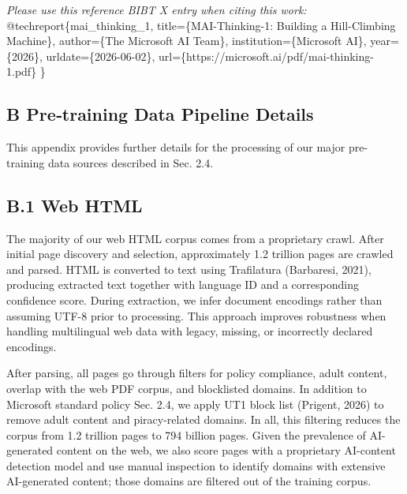 \documentclass[
  10
]{article}
\newenvironment{Shaded}{}{}
\newcommand{\CommentTok}[1]{\textcolor[rgb]{0.38,0.63,0.69}{\textit{#1}}}
\newcommand{\DataTypeTok}[1]{\textcolor[rgb]{0.56,0.13,0.00}{#1}}
\newcommand{\NormalTok}[1]{#1}
\newcommand{\OtherTok}[1]{\textcolor[rgb]{0.00,0.44,0.13}{#1}}
\newcommand{\VariableTok}[1]{\textcolor[rgb]{0.10,0.09,0.49}{#1}}
\begin{document}
\begin{Shaded}
\begin{Highlighting}[]
\CommentTok{Please use this reference BIBT X entry when citing this work:}
\VariableTok{@techreport}\NormalTok{\{}\OtherTok{mai\_thinking\_1}\NormalTok{,}
\DataTypeTok{title}\NormalTok{=\{MAI{-}Thinking{-}1: Building a Hill{-}Climbing Machine\},}
\DataTypeTok{author}\NormalTok{=\{The Microsoft AI Team\},}
\DataTypeTok{institution}\NormalTok{=\{Microsoft AI\},}
\DataTypeTok{year}\NormalTok{=\{2026\},}
\DataTypeTok{urldate}\NormalTok{=\{2026{-}06{-}02\},}
\DataTypeTok{url}\NormalTok{=\{https://microsoft.ai/pdf/mai{-}thinking{-}1.pdf\}}
\NormalTok{\}}
\end{Highlighting}
\end{Shaded}

\subsection{B Pre‐training Data Pipeline
Details}\label{b-pretraining-data-pipeline-details}

This appendix provides further details for the processing of our major
pre-training data sources described in Sec. 2.4.

\subsection{B.1 Web HTML}\label{b.1-web-html}

The majority of our web HTML corpus comes from a proprietary crawl.
After initial page discovery and selection, approximately 1.2 trillion
pages are crawled and parsed. HTML is converted to text using
Trafilatura (Barbaresi, 2021), producing extracted text together with
language ID and a corresponding confidence score. During extraction, we
infer document encodings rather than assuming UTF-8 prior to processing.
This approach improves robustness when handling multilingual web data
with legacy, missing, or incorrectly declared encodings.

After parsing, all pages go through filters for policy compliance, adult
content, overlap with the web PDF corpus, and blocklisted domains. In
addition to Microsoft standard policy Sec. 2.4, we apply UT1 block list
(Prigent, 2026) to remove adult content and piracy-related domains. In
all, this filtering reduces the corpus from 1.2 trillion pages to 794
billion pages. Given the prevalence of AI-generated content on the web,
we also score pages with a proprietary AI-content detection model and
use manual inspection to identify domains with extensive AI-generated
content; those domains are filtered out of the training corpus.
\end{document}
